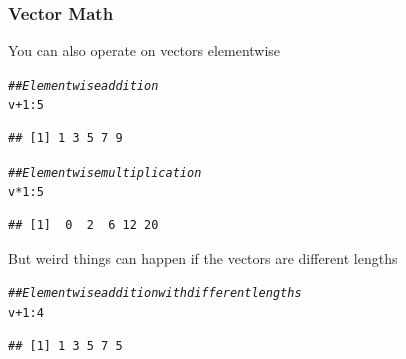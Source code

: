\documentclass{beamer}\usepackage[]{graphicx}\usepackage[]{xcolor}
\makeatletter
\newcommand{\hlnum}[1]{\textcolor[rgb]{0.686,0.059,0.569}{#1}}%
\newcommand{\hlcom}[1]{\textcolor[rgb]{0.678,0.584,0.686}{\textit{#1}}}%
\newcommand{\hlopt}[1]{\textcolor[rgb]{0,0,0}{#1}}%
\newcommand{\hlstd}[1]{\textcolor[rgb]{0.345,0.345,0.345}{#1}}%
\newenvironment{kframe}{%
 \def\at@end@of@kframe{}%
 \ifinner\ifhmode%
  \def\at@end@of@kframe{\end{minipage}}%
  \begin{minipage}{\columnwidth}%
 \fi\fi%
 \def\FrameCommand##1{\hskip\@totalleftmargin \hskip-\fboxsep
 \colorbox{shadecolor}{##1}\hskip-\fboxsep
     \hskip-\linewidth \hskip-\@totalleftmargin \hskip\columnwidth}%
 \MakeFramed {\advance\hsize-\width
   \@totalleftmargin\z@ \linewidth\hsize
   \@setminipage}}%
 {\par\unskip\endMakeFramed%
 \at@end@of@kframe}
\newenvironment{knitrout}{}{} %
\makeatother
\begin{document}
\begin{frame}[fragile]\frametitle{Vector Math}
    You can also operate on vectors elementwise
\begin{knitrout}\footnotesize
{}\color{fgcolor}\begin{kframe}
\begin{alltt}
\hlcom{## Elementwise addition}
\hlstd{v} \hlopt{+} \hlnum{1}\hlopt{:}\hlnum{5}
\end{alltt}
\begin{verbatim}
## [1] 1 3 5 7 9
\end{verbatim}
\begin{alltt}
\hlcom{## Elementwise multiplication}
\hlstd{v} \hlopt{*} \hlnum{1}\hlopt{:}\hlnum{5}
\end{alltt}
\begin{verbatim}
## [1]  0  2  6 12 20
\end{verbatim}
\end{kframe}
\end{knitrout}
    \vspace{3ex}
    But weird things can happen if the vectors are different lengths
\begin{knitrout}\footnotesize
{}\color{fgcolor}\begin{kframe}
\begin{alltt}
\hlcom{## Elementwise addition with different lengths}
\hlstd{v} \hlopt{+} \hlnum{1}\hlopt{:}\hlnum{4}
\end{alltt}


{\ttfamily\noindent\color{warningcolor}{\#\# Warning in v + 1:4: longer object length is not a multiple of shorter object length}}\begin{verbatim}
## [1] 1 3 5 7 5
\end{verbatim}
\end{kframe}
\end{knitrout}
\end{frame}
\end{document}
